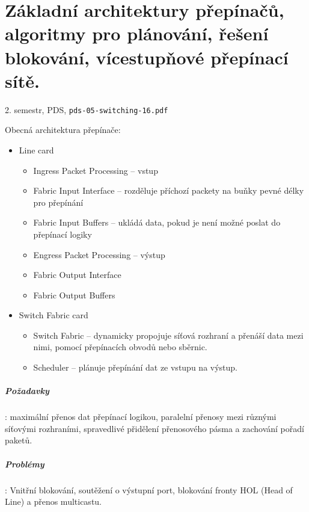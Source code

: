 \documentclass[a4paper, 11pt]{report}
\begin{document}
\chapter{Základní architektury přepínačů, algoritmy pro plánování, řešení blokování, vícestupňové přepínací sítě.} \label{cha:39}
2. semestr, PDS, \texttt{pds-05-switching-16.pdf}

Obecná architektura přepínače:
\begin{itemize}
	\item Line card
	\begin{itemize}
		\item Ingress Packet Processing -- vstup
		\item Fabric Input Interface -- rozděluje příchozí packety na buňky pevné délky pro přepínání
		\item Fabric Input Buffers -- ukládá data, pokud je není možné poslat do přepínací logiky
		\item Engress Packet Processing -- výstup
		\item Fabric Output Interface
		\item Fabric Output Buffers
	\end{itemize}
	\item Switch Fabric card
	\begin{itemize}
		\item Switch Fabric -- dynamicky propojuje síťová rozhraní a přenáší data mezi nimi, pomocí přepínacích obvodů nebo sběrnic.
		\item Scheduler -- plánuje přepínání dat ze vstupu na výstup.
	\end{itemize}
\end{itemize}

\paragraph{Požadavky}: maximální přenos dat přepínací logikou, paralelní přenosy mezi různými síťovými rozhraními, spravedlivé přidělení přenosového pásma a zachování pořadí paketů.

\paragraph{Problémy}: Vnitřní blokování, soutěžení o výstupní port, blokování fronty HOL (Head of Line) a přenos multicastu.
\end{document}
